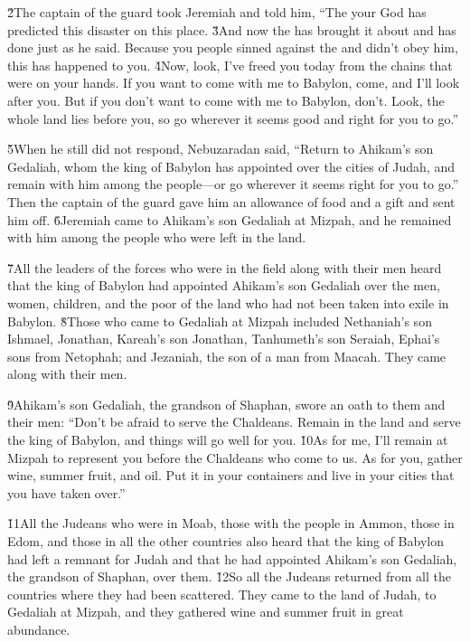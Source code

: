 \v{2}The captain of the guard took Jeremiah and told him, ``The  your God has predicted this disaster on this place. \v{3}And now the  has brought it about and has done just as he said. Because you people sinned against the  and didn't obey him, this has happened to you. \v{4}Now, look, I've freed you today from the chains that were on your hands. If you want to come with me to Babylon, come, and I'll look after you. But if you don't want to come with me to Babylon, don't. Look, the whole land lies before you, so go wherever it seems good and right for you to go.''

\v{5}When he still did not respond, Nebuzaradan said, ``Return to Ahikam's son Gedaliah, whom the king of Babylon has appointed over the cities of Judah, and remain with him among the people---or go wherever it seems right for you to go.'' Then the captain of the guard gave him an allowance of food and a gift and sent him off. \v{6}Jeremiah came to Ahikam's son Gedaliah at Mizpah, and he remained with him among the people who were left in the land.

\v{7}All the leaders of the forces who were in the field along with their men heard that the king of Babylon had appointed Ahikam's son Gedaliah over the men, women, children, and the poor of the land who had not been taken into exile in Babylon. \v{8}Those who came to Gedaliah at Mizpah included Nethaniah's son Ishmael, Jonathan, Kareah's son Jonathan, Tanhumeth's son Seraiah, Ephai's sons from Netophah; and Jezaniah, the son of a man from Maacah. They came along with their men.

\v{9}Ahikam's son Gedaliah, the grandson of Shaphan, swore an oath to them and their men: ``Don't be afraid to serve the Chaldeans. Remain in the land and serve the king of Babylon, and things will go well for you. \v{10}As for me, I'll remain at Mizpah to represent you before the Chaldeans who come to us. As for you, gather wine, summer fruit, and oil. Put it in your containers and live in your cities that you have taken over.''

\v{11}All the Judeans who were in Moab, those with the people in Ammon, those in Edom, and those in all the other countries also heard that the king of Babylon had left a remnant for Judah and that he had appointed Ahikam's son Gedaliah, the grandson of Shaphan, over them. \v{12}So all the Judeans returned from all the countries where they had been scattered. They came to the land of Judah, to Gedaliah at Mizpah, and they gathered wine and summer fruit in great abundance.

